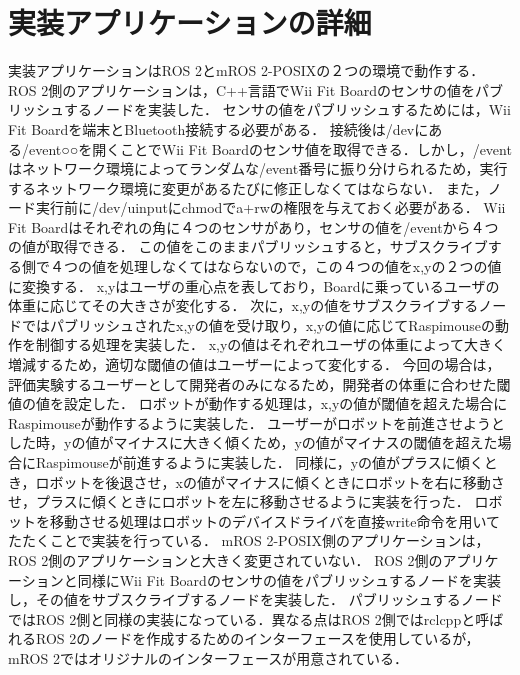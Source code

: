 \section{実装アプリケーションの詳細}
実装アプリケーションはROS 2とmROS 2-POSIXの２つの環境で動作する．
ROS 2側のアプリケーションは，C++言語でWii Fit Boardのセンサの値をパブリッシュするノードを実装した．
センサの値をパブリッシュするためには，Wii Fit Boardを端末とBluetooth接続する必要がある．
接続後は/devにある/event○○を開くことでWii Fit Boardのセンサ値を取得できる．しかし，/eventはネットワーク環境によってランダムな/event番号に振り分けられるため，実行するネットワーク環境に変更があるたびに修正しなくてはならない．
また，ノード実行前に/dev/uinputにchmodでa+rwの権限を与えておく必要がある．
Wii Fit Boardはそれぞれの角に４つのセンサがあり，センサの値を/eventから４つの値が取得できる．
この値をこのままパブリッシュすると，サブスクライブする側で４つの値を処理しなくてはならないので，この４つの値をx,yの２つの値に変換する．
x,yはユーザの重心点を表しており，Boardに乗っているユーザの体重に応じてその大きさが変化する．
次に，x,yの値をサブスクライブするノードではパブリッシュされたx,yの値を受け取り，x,yの値に応じてRaspimouseの動作を制御する処理を実装した．
x,yの値はそれぞれユーザの体重によって大きく増減するため，適切な閾値の値はユーザーによって変化する．
今回の場合は，評価実験するユーザーとして開発者のみになるため，開発者の体重に合わせた閾値の値を設定した．
ロボットが動作する処理は，x,yの値が閾値を超えた場合にRaspimouseが動作するように実装した．
ユーザーがロボットを前進させようとした時，yの値がマイナスに大きく傾くため，yの値がマイナスの閾値を超えた場合にRaspimouseが前進するように実装した．
同様に，yの値がプラスに傾くとき，ロボットを後退させ，xの値がマイナスに傾くときにロボットを右に移動させ，プラスに傾くときにロボットを左に移動させるように実装を行った．
ロボットを移動させる処理はロボットのデバイスドライバを直接write命令を用いてたたくことで実装を行っている．
mROS 2-POSIX側のアプリケーションは，ROS 2側のアプリケーションと大きく変更されていない．
ROS 2側のアプリケーションと同様にWii Fit Boardのセンサの値をパブリッシュするノードを実装し，その値をサブスクライブするノードを実装した．
パブリッシュするノードではROS 2側と同様の実装になっている．異なる点はROS 2側ではrclcppと呼ばれるROS 2のノードを作成するためのインターフェースを使用しているが，mROS 2ではオリジナルのインターフェースが用意されている．

